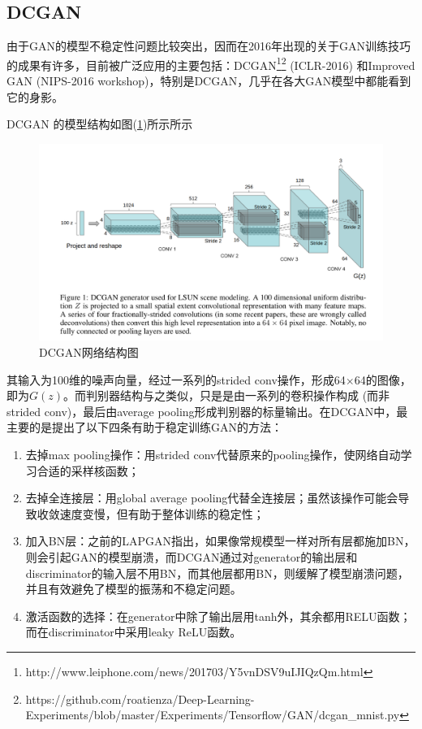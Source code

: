     \subsection{DCGAN}
        \par
        由于GAN的模型不稳定性问题比较突出，因而在2016年出现的关于GAN训练技巧的成果有许多，目前被广泛应用的主要包括：DCGAN\footnote{http://www.leiphone.com/news/201703/Y5vnDSV9uIJIQzQm.html}\footnote{https://github.com/roatienza/Deep-Learning-Experiments/blob/master/Experiments/Tensorflow/GAN/dcgan\_mnist.py} (ICLR-2016) 和Improved GAN (NIPS-2016 workshop)，特别是DCGAN，几乎在各大GAN模型中都能看到它的身影。
        \par
        DCGAN\cite{2015.Radford} 的模型结构如图(\ref{fig:DCGAN网络结构图})所示所示
                \begin{figure}[H]
                \centering
                \includegraphics[width=12cm]{images/DCGAN_network.jpg}
                \caption{DCGAN网络结构图}
                \label{fig:DCGAN网络结构图}
                \end{figure}
        其输入为100维的噪声向量，经过一系列的strided conv操作，形成64$\times$64的图像，即为$G(z)$。而判别器结构与之类似，只是是由一系列的卷积操作构成 (而非strided conv)，最后由average pooling形成判别器的标量输出。在DCGAN\cite{2015.Radford}中，最主要的是提出了以下四条有助于稳定训练GAN的方法：
        \begin{enumerate}
        \item 去掉max pooling操作：用strided conv代替原来的pooling操作，使网络自动学习合适的采样核函数；
        \item 去掉全连接层：用global average pooling代替全连接层；虽然该操作可能会导致收敛速度变慢，但有助于整体训练的稳定性；
        \item 加入BN层：之前的LAPGAN\cite{2015.Denton}指出，如果像常规模型一样对所有层都施加BN，则会引起GAN的模型崩溃，而DCGAN通过对generator的输出层和discriminator的输入层不用BN，而其他层都用BN，则缓解了模型崩溃问题，并且有效避免了模型的振荡和不稳定问题。
        \item 激活函数的选择：在generator中除了输出层用tanh外，其余都用RELU函数；而在discriminator中采用leaky ReLU函数。
        \end{enumerate}

